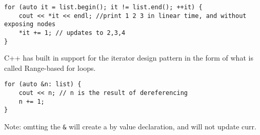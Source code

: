 \documentclass[12pt]{article}
\begin{document}
\begin{lstlisting}
for (auto it = list.begin(); it != list.end(); ++it) {
    cout << *it << endl; //print 1 2 3 in linear time, and without exposing nodes
    *it += 1; // updates to 2,3,4
}
\end{lstlisting}
C++ has built in support for the iterator design pattern in the form of what is called Range-based for loops.
\begin{lstlisting}
for (auto &n: list) {
    cout << n; // n is the result of dereferencing
    n += 1;
}
\end{lstlisting}
Note: omtting the \lstinline{&} will create a by value declaration, and will not update curr.
\end{document}
